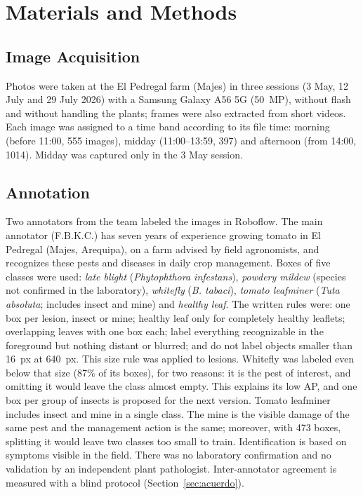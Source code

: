 \documentclass[sensors,article,submit,pdftex,moreauthors]{Definitions/mdpi}
\begin{document}
\section{Materials and Methods}

\subsection{\color{blue} Image Acquisition}

{\color{blue} Photos were taken at the El Pedregal farm (Majes) in three sessions (3 May, 12 July and 29 July 2026) with a Samsung Galaxy A56 5G (50~MP), without flash and without handling the plants; frames were also extracted from short videos.} {\color{blue} Each image was assigned to a time band according to its file time: morning (before 11:00, 555 images), midday (11:00--13:59, 397) and afternoon (from 14:00, 1014).} {\color{blue} Midday was captured only in the 3 May session.}

\subsection{\color{blue} Annotation}\label{sec:anotacion}

{\color{blue} Two annotators from the team labeled the images in Roboflow.} {\color{blue} The main annotator (F.B.K.C.) has seven years of experience growing tomato in El Pedregal (Majes, Arequipa), on a farm advised by field agronomists, and recognizes these pests and diseases in daily crop management.} {\color{blue} Boxes of five classes were used:} {\color{blue} \emph{late blight} (\emph{Phytophthora infestans}), \emph{powdery mildew} (species not confirmed in the laboratory), \emph{whitefly} (\emph{B. tabaci}), \emph{tomato leafminer} (\emph{Tuta absoluta}; includes insect and mine) and \emph{healthy leaf}.} {\color{blue} The written rules were: one box per lesion, insect or mine; healthy leaf only for completely healthy leaflets; overlapping leaves with one box each; label everything recognizable in the foreground but nothing distant or blurred; and do not label objects smaller than 16~px at 640~px.} {\color{blue} This size rule was applied to lesions.} {\color{blue} Whitefly was labeled even below that size (87\% of its boxes), for two reasons: it is the pest of interest, and omitting it would leave the class almost empty.} {\color{blue} This explains its low AP, and one box per group of insects is proposed for the next version.} {\color{blue} Tomato leafminer includes insect and mine in a single class.} {\color{blue} The mine is the visible damage of the same pest and the management action is the same; moreover, with 473 boxes, splitting it would leave two classes too small to train.} {\color{blue} Identification is based on symptoms visible in the field.} {\color{blue} There was no laboratory confirmation and no validation by an independent plant pathologist.} {\color{blue} Inter-annotator agreement is measured with a blind protocol (Section~\ref{sec:acuerdo}).}
\end{document}
